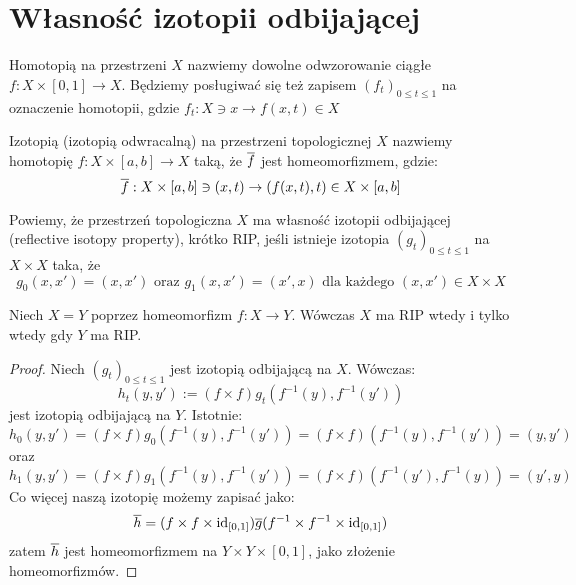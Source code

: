 \section{Własność izotopii odbijającej}

\begin{df}
  Homotopią na przestrzeni $X$ nazwiemy dowolne odwzorowanie ciągłe $f: X \times [0,1] \rightarrow X$. Będziemy posługiwać się też zapisem $(f_t)_{0 \leq t \leq 1}$ na oznaczenie homotopii, gdzie $f_t: X \ni x \rightarrow f(x,t) \in X$
\end{df}


\begin{df}
  Izotopią (izotopią odwracalną) na przestrzeni topologicznej $X$ nazwiemy homotopię $f: X \times [a, b] \rightarrow X$ taką, że $\overline{f}$ jest homeomorfizmem, gdzie:
  \[\overline{f}: X \times [a,b] \ni (x, t) \rightarrow (f(x, t), t) \in X \times [a,b]\]
\end{df}

\begin{df}
  Powiemy, że przestrzeń topologiczna $X$ ma własność izotopii odbijającej (reflective isotopy property), krótko RIP, jeśli istnieje izotopia $(g_t)_{0 \leq t \leq 1}$ na $X \times X$ taka, że
  \[g_0(x, x') = (x, x') \mbox{ oraz } g_1(x, x') = (x', x) \mbox{ dla każdego } (x, x') \in X \times X\]
\end{df}

\begin{ex}
  Niech $X = Y$ poprzez homeomorfizm $f: X \rightarrow Y$. Wówczas $X$ ma RIP wtedy i tylko wtedy gdy $Y$ ma RIP.
  \begin{proof}
    Niech $(g_t)_{0 \leq t \leq 1}$ jest izotopią odbijającą na $X$. Wówczas:
    \[h_t(y, y') := (f \times f) g_t(f^{-1}(y), f^{-1}(y'))\]
    jest izotopią odbijającą na $Y$. Istotnie:
    \[h_0(y,y') = (f \times f) g_0(f^{-1}(y), f^{-1}(y')) = (f \times f)(f^{-1}(y), f^{-1}(y')) = (y, y')\]
    oraz
    \[h_1(y,y') = (f \times f) g_1(f^{-1}(y), f^{-1}(y')) = (f \times f)(f^{-1}(y'), f^{-1}(y)) = (y', y)\]
    Co więcej naszą izotopię możemy zapisać jako:
    \[\overline{h} = (f \times f \times \mbox{id}_{[0,1]}) \overline{g} (f^{-1} \times f^{-1} \times \mbox{id}_{[0,1]})\]
    zatem $\overline{h}$ jest homeomorfizmem na $Y \times Y \times [0,1]$, jako złożenie homeomorfizmów.
  \end{proof}
\end{ex}


